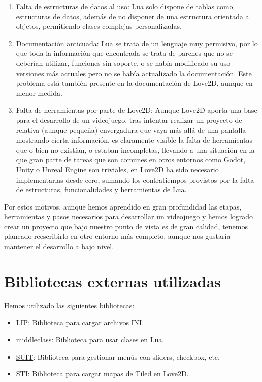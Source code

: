 \documentclass[12pt, spanish]{article}
\begin{document}
\begin{enumerate}
	\item Falta de estructuras de datos al uso: Lua solo dispone de tablas como estructuras de datos, además de no disponer de una estructura orientada a objetos, permitiendo clases complejas personalizadas.
	\item Documentación anticuada: Lua se trata de un lenguaje muy permisivo, por lo que toda la información que encontrada se trata de parches que no se deberían utilizar, funciones sin soporte, o se había modificado su uso versiones más actuales pero no se había actualizado la documentación. Este problema está también presente en la documentación de Love2D, aunque en menor medida.
	\item Falta de herramientas por parte de Love2D: Aunque Love2D aporta una base para el desarrollo de un videojuego, tras intentar realizar un proyecto de relativa (aunque pequeña) envergadura que vaya más allá de una pantalla mostrando cierta información, es claramente visible la falta de herramientas que o bien no existían, o estaban incompletas, llevando a una situación en la que gran parte de tareas que son comunes en otros entornos como Godot, Unity o Unreal Engine son triviales, en Love2D ha sido necesario implementarlas desde cero, sumando los contratiempos provistos por la falta de estructuras, funcionalidades y herramientas de Lua.
\end{enumerate}

Por estos motivos, aunque hemos aprendido en gran profundidad las etapas, herramientas y pasos necesarios para desarrollar un videojuego y hemos logrado crear un proyecto que bajo nuestro punto de vista es de gran calidad, tenemos planeado reescribirlo en otro entorno más completo, aunque nos gustaría mantener el desarrollo a bajo nivel.

\section{Bibliotecas externas utilizadas}

Hemos utilizado las siguientes bibliotecas:

\begin{itemize}
	\item \href{https://github.com/Dynodzzo/Lua_INI_Parser}{LIP}: Biblioteca para cargar archivos INI.
	\item \href{https://github.com/kikito/middleclass}{middleclass}: Biblioteca para usar clases en Lua.
	\item \href{https://github.com/vrld/suit}{SUIT}: Biblioteca para gestionar menús con sliders, checkbox, etc.
	\item \href{https://github.com/karai17/Simple-Tiled-Implementation}{STI}: Biblioteca para cargar mapas de Tiled en Love2D.
\end{itemize}
\end{document}
